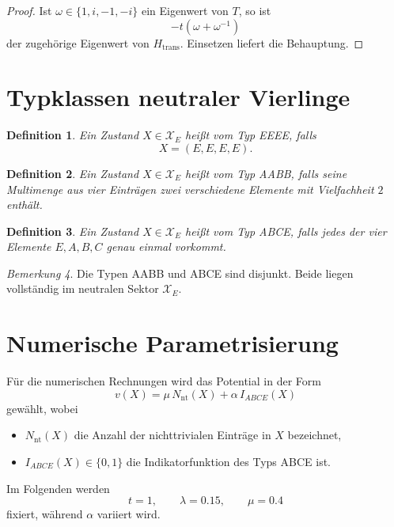 \documentclass[11pt,a4paper]{article}
\newtheorem{definition}{Definition}[section]
\theoremstyle{remark}
\newtheorem{remark}[definition]{Bemerkung}
\newcommand{\XE}{\mathcal X_E}
\begin{document}
	\begin{proof}
		Ist \(\omega\in\{1,i,-1,-i\}\) ein Eigenwert von \(T\), so ist
		\[
		-t(\omega+\omega^{-1})
		\]
		der zugehörige Eigenwert von \(H_{\mathrm{trans}}\). Einsetzen liefert die Behauptung.
	\end{proof}
	
	\section{Typklassen neutraler Vierlinge}
	
	\begin{definition}
		Ein Zustand \(X\in \XE\) heißt vom Typ \emph{EEEE}, falls
		\[
		X=(E,E,E,E).
		\]
	\end{definition}
	
	\begin{definition}
		Ein Zustand \(X\in \XE\) heißt vom Typ \emph{AABB}, falls seine Multimenge aus vier Einträgen zwei verschiedene Elemente mit Vielfachheit \(2\) enthält.
	\end{definition}
	
	\begin{definition}
		Ein Zustand \(X\in \XE\) heißt vom Typ \emph{ABCE}, falls jedes der vier Elemente \(E,A,B,C\) genau einmal vorkommt.
	\end{definition}
	
	\begin{remark}
		Die Typen AABB und ABCE sind disjunkt. Beide liegen vollständig im neutralen Sektor \(\XE\).
	\end{remark}
	
	\section{Numerische Parametrisierung}
	
	Für die numerischen Rechnungen wird das Potential in der Form
	\[
	v(X)=\mu\,N_{\mathrm{nt}}(X)+\alpha\,I_{ABCE}(X)
	\]
	gewählt, wobei
	\begin{itemize}
		\item \(N_{\mathrm{nt}}(X)\) die Anzahl der nichttrivialen Einträge in \(X\) bezeichnet,
		\item \(I_{ABCE}(X)\in\{0,1\}\) die Indikatorfunktion des Typs ABCE ist.
	\end{itemize}
	
	Im Folgenden werden
	\[
	t=1,\qquad \lambda=0.15,\qquad \mu=0.4
	\]
	fixiert, während \(\alpha\) variiert wird.
	
\end{document}
